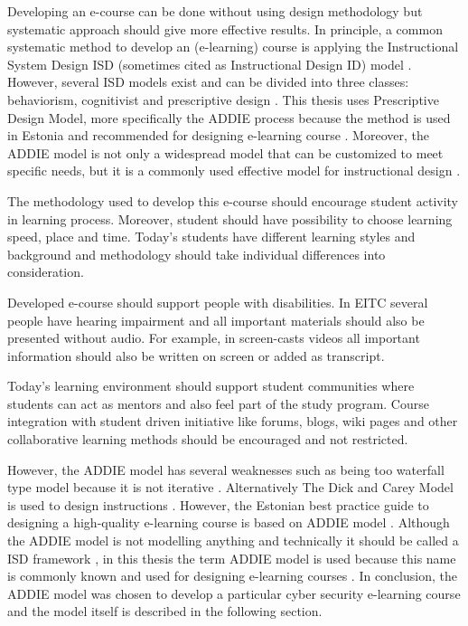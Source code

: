 Developing an e-course can be done without using design methodology but systematic approach should give more effective results. In principle, a common systematic method to develop an (e-learning) course is applying the Instructional System Design \gls{ISD} (sometimes cited as  Instructional Design \gls{ID}) model \citep{website:id_models}. However, several \gls{ISD} models exist and can be divided into three classes: behaviorism, cognitivist and prescriptive design \citep{website:id_models}. This thesis uses Prescriptive Design Model, more specifically the \gls{ADDIE} process because the method is used in Estonia and recommended for designing e-learning course \citep[p.~5]{OppeArenduskeskus2010}. Moreover, the \gls{ADDIE} model is not only a widespread model that can be customized to meet specific needs, but it is a commonly used effective model for instructional  design \citep{ieee_addie_1607206}.

The methodology used to develop this e-course should encourage student activity in learning process. Moreover, student should have possibility to choose learning speed, place and time. Today's students have different learning styles and background and methodology should take individual differences into consideration.

Developed e-course should support people with disabilities. In \gls{EITC} several people have hearing impairment and all important materials should also be presented without audio. For example, in screen-casts videos all important information should also be written on screen or added as transcript.

Today’s learning environment should support student communities where students can act as mentors and also feel part of the study program. Course integration with student driven initiative like forums, blogs, wiki pages and other collaborative learning methods should be encouraged and not restricted.

 However, the \gls{ADDIE} model has several weaknesses such as being too waterfall type model because it is not iterative \citep{website:weakesses_of_ADDIE_model}. Alternatively The Dick and Carey Model is used to design instructions \citep{dick2005systematic}. However, the Estonian best practice guide to designing a high-quality e-learning course is based on \gls{ADDIE} model \citep{OppeArenduskeskus2010}. Although the \gls{ADDIE} model is not modelling anything and technically it should be called a \gls{ISD} framework \citep{bichelmeyer2004addie}, in this thesis the term \gls{ADDIE} model is used because this name is commonly known and used for designing e-learning courses \citep{bichelmeyer2004addie, OppeArenduskeskus2010}.
In conclusion, the \gls{ADDIE} model was chosen to develop a particular cyber security e-learning course and the model itself is described in the following section.

